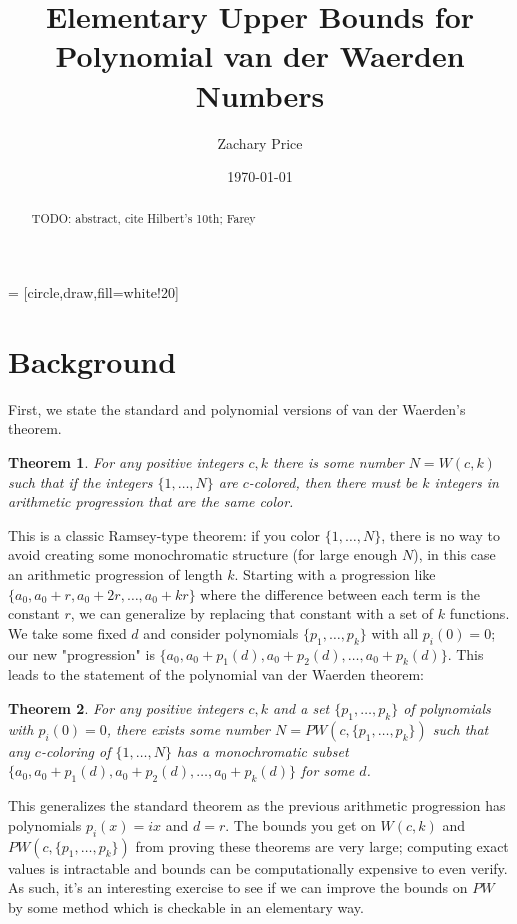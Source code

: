 \documentclass[a4paper]{amsproc}
\title{Elementary Upper Bounds for Polynomial van der Waerden Numbers}
\author[Price]{Zachary Price}
\date{\today}
\theoremstyle{plain}
\newtheorem{thm}{Theorem}[section]
\begin{document}
 = [circle,draw,fill=white!20]

\vspace{18mm} \setcounter{page}{1} \thispagestyle{empty}

\begin{abstract}
TODO: abstract, cite Hilbert's 10th; Farey
\end{abstract}

\maketitle

\section{Background}

First, we state the standard and polynomial versions of van der Waerden's theorem.

\begin{thm}
  For any positive integers $c,k$ there is some number $N=W(c,k)$ such that if the integers $\{1,\ldots,N\}$ are $c$-colored, then there must be $k$ integers in arithmetic progression that are the same color.
\end{thm}

This is a classic Ramsey-type theorem: if you color $\{1,\ldots,N\}$, there is no way to avoid creating some monochromatic structure (for large enough $N$), in this case an arithmetic progression of length $k$.
Starting with a progression like $\{a_0, a_0+r, a_0+2r,\ldots, a_0+kr\}$ where the difference between each term is the constant $r$, we can generalize by replacing that constant with a set of $k$ functions.
We take some fixed $d$ and consider polynomials $\{p_1,\ldots,p_k\}$ with all $p_i(0)=0$; our new "progression" is $\{a_0, a_0+p_1(d), a_0+p_2(d),\ldots, a_0+p_k(d)\}$.
This leads to the statement of the polynomial van der Waerden theorem:

\begin{thm}
  For any positive integers $c,k$ and a set $\{p_1,\ldots,p_k\}$ of polynomials with $p_i(0)=0$, there exists some number $N=PW(c,\{p_1,\ldots,p_k\})$ such that any $c$-coloring of $\{1,\ldots,N\}$ has a monochromatic subset $\{a_0, a_0+p_1(d), a_0+p_2(d),\ldots, a_0+p_k(d)\}$ for some $d$.
\end{thm}

This generalizes the standard theorem as the previous arithmetic progression has polynomials $p_i(x) = ix$ and $d=r$.
The bounds you get on $W(c,k)$ and $PW(c,\{p_1,\ldots,p_k\})$ from proving these theorems are very large; computing exact values is intractable and bounds can be computationally expensive to even verify.
As such, it's an interesting exercise to see if we can improve the bounds on $PW$ by some method which is checkable in an elementary way.
\end{document}
